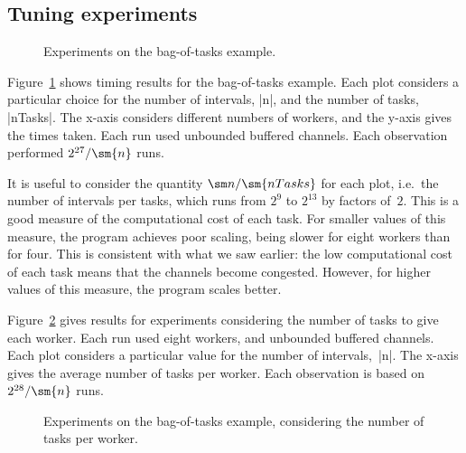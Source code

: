 \subsection{Tuning experiments}


\begin{figure}
\begin{center}

\end{center}
\caption{Experiments on the bag-of-tasks example.}
\label{fig:bag-of-tasks-experiment}
\end{figure}


Figure~\ref{fig:bag-of-tasks-experiment} shows timing results for the
bag-of-tasks example.  Each plot considers a particular choice for the number
of intervals, |n|, and the number of tasks, |nTasks|.  The x-axis considers
different numbers of workers, and the y-axis gives the times taken.  Each run
used unbounded buffered channels.  Each observation performed $2^{27}/\sm{n}$
runs.

It is useful to consider the quantity $\sm n / \sm{nTasks}$ for each plot,
i.e.~the number of intervals per tasks, which runs from $2^9$ to $2^{13}$ by
factors of~$2$.  This is a good measure of the computational cost of each
task.   For smaller values of this measure, the program achieves poor scaling,
being slower for eight workers than for four.  This is consistent with what we
saw earlier: the low computational cost of each task means that the channels
become congested.  However, for higher values of this measure, the program
scales better.  


Figure~\ref{fig:bag-of-tasks-experiment-2} gives results for experiments
considering the number of tasks to give each worker.  Each run used eight
workers, and unbounded buffered channels.  Each plot considers a particular
value for the number of intervals,~|n|.  The x-axis gives the average number
of tasks per worker.  Each observation is based on $2^{28}/\sm{n}$ runs.

\begin{figure}
\begin{center}

\end{center}
\caption{Experiments on the bag-of-tasks example, considering the number of
  tasks per worker.}
\label{fig:bag-of-tasks-experiment-2}
\end{figure}

